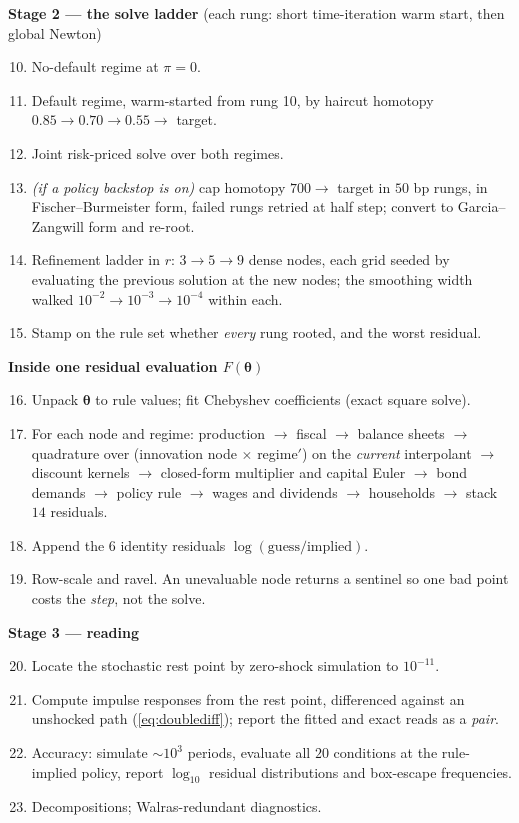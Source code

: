 \documentclass[10pt,a4paper]{article}
\theoremstyle{definition}
\theoremstyle{plain}
\theoremstyle{remark}
\newcommand{\pol}{\bm{\theta}}
\begin{document}
\begin{framed}
\medskip
\noindent\textbf{Stage 2 --- the solve ladder} (each rung: short time-iteration warm start,
then global Newton)
\begin{enumerate}\setcounter{enumi}{9}\itemsep1pt
\item No-default regime at $\pi=0$.
\item Default regime, warm-started from rung 10, by haircut homotopy $0.85\to0.70\to0.55\to$
target.
\item Joint risk-priced solve over both regimes.
\item \emph{(if a policy backstop is on)} cap homotopy $700\to$ target in $50$ bp rungs, in
Fischer--Burmeister form, failed rungs retried at half step; convert to Garcia--Zangwill form
and re-root.
\item Refinement ladder in $r$: $3\to5\to9$ dense nodes, each grid seeded by evaluating the
previous solution at the new nodes; the smoothing width walked
$10^{-2}\to10^{-3}\to10^{-4}$ within each.
\item Stamp on the rule set whether \emph{every} rung rooted, and the worst residual.
\end{enumerate}

\medskip
\noindent\textbf{Inside one residual evaluation $F(\pol)$}
\begin{enumerate}\setcounter{enumi}{15}\itemsep1pt
\item Unpack $\pol$ to rule values; fit Chebyshev coefficients (exact square solve).
\item For each node and regime: production $\to$ fiscal $\to$ balance sheets $\to$
quadrature over (innovation node $\times$ regime$'$) on the \emph{current} interpolant $\to$
discount kernels $\to$ closed-form multiplier and capital Euler $\to$ bond demands $\to$
policy rule $\to$ wages and dividends $\to$ households $\to$ stack $14$ residuals.
\item Append the $6$ identity residuals $\log(\text{guess}/\text{implied})$.
\item Row-scale and ravel. An unevaluable node returns a sentinel so one bad point costs the
\emph{step}, not the solve.
\end{enumerate}

\medskip
\noindent\textbf{Stage 3 --- reading}
\begin{enumerate}\setcounter{enumi}{19}\itemsep1pt
\item Locate the stochastic rest point by zero-shock simulation to $10^{-11}$.
\item Compute impulse responses from the rest point, differenced against an unshocked path
(\eqref{eq:doublediff}); report the fitted and exact reads as a \emph{pair}.
\item Accuracy: simulate $\sim10^3$ periods, evaluate all $20$ conditions at the rule-implied
policy, report $\log_{10}$ residual distributions and box-escape frequencies.
\item Decompositions; Walras-redundant diagnostics.
\end{enumerate}
\end{framed}
\end{document}
